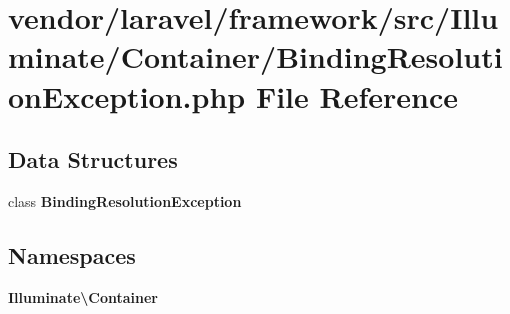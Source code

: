 \section{vendor/laravel/framework/src/\+Illuminate/\+Container/\+Binding\+Resolution\+Exception.php File Reference}
\label{_binding_resolution_exception_8php}
\subsection*{Data Structures}
\begin{DoxyCompactItemize}
\item 
class {\bf Binding\+Resolution\+Exception}
\end{DoxyCompactItemize}
\subsection*{Namespaces}
\begin{DoxyCompactItemize}
\item 
 {\bf Illuminate\textbackslash{}\+Container}
\end{DoxyCompactItemize}
